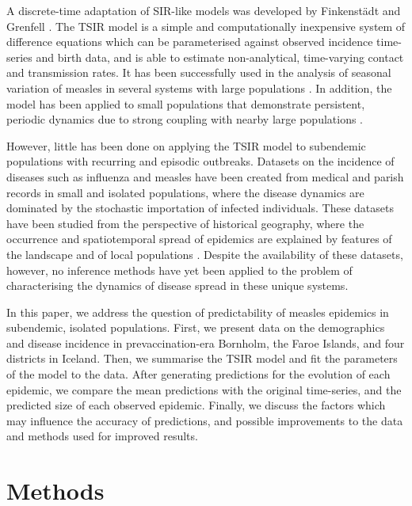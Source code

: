 \documentclass[10pt]{article}
\begin{document}
A discrete-time adaptation of SIR-like models was developed by Finkenst\"{a}dt and Grenfell \cite{Finkenstadt2000}. The TSIR model is a simple and computationally inexpensive system of difference equations which can be parameterised against observed incidence time-series and birth data, and is able to estimate non-analytical, time-varying contact and transmission rates. It has been successfully used in the analysis of seasonal variation of measles in several systems with large populations \cite{Glass2003, Metcalf2010}. In addition, the model has been applied to small populations that demonstrate persistent, periodic dynamics due to strong coupling with nearby large populations \cite{Grenfell2002, Bjornstad2002}. 

However, little has been done on applying the TSIR model to subendemic populations with recurring and episodic outbreaks. Datasets on the incidence of diseases such as influenza and measles have been created from medical and parish records in small and isolated populations, where the disease dynamics are dominated by the stochastic importation of infected individuals. These datasets have been studied from the perspective of historical geography, where the occurrence and spatiotemporal spread of epidemics are explained by features of the landscape and of local populations \cite{Cliff1981, Cliff2000}. Despite the availability of these datasets, however, no inference methods have yet been applied to the problem of characterising the dynamics of disease spread in these unique systems.

In this paper, we address the question of predictability of measles epidemics in subendemic, isolated populations. First, we present data on the demographics and disease incidence in prevaccination-era Bornholm, the Faroe Islands, and four districts in Iceland. Then, we summarise the TSIR model and fit the parameters of the model to the data. After generating predictions for the evolution of each epidemic, we compare the mean predictions with the original time-series, and the predicted size of each observed epidemic. Finally, we discuss the factors which may influence the accuracy of predictions, and possible improvements to the data and methods used for improved results.














\section*{Methods}
\end{document}
